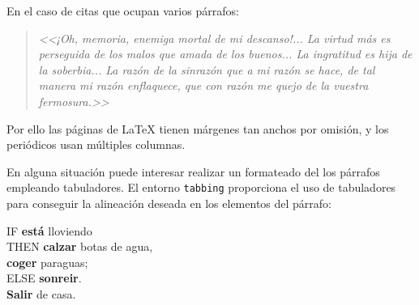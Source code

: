 \documentclass[11pt,a4paper]{report}
\begin{document}
En el caso de citas que ocupan varios párrafos:


\begin{quotation}
\emph{<<¡Oh, memoria, enemiga mortal de mi descanso!...
La virtud más es perseguida de los malos que amada de los buenos...
La ingratitud es hija de la soberbia...
La razón de la sinrazón que a mi razón se hace, de tal manera mi razón enflaquece, que con razón me quejo de la vuestra fermosura.>>}
\end{quotation}

Por ello las páginas de \LaTeX{} tienen márgenes tan anchos por omisión, y los periódicos usan múltiples columnas. 


En alguna situación puede interesar realizar un formateado del los párrafos empleando tabuladores. El entorno \texttt{tabbing} proporciona el uso de tabuladores para conseguir la alineación deseada en los elementos del párrafo:


\begin{tabbing}
IF	\= \textbf{está} lloviendo                \\
    \> THEN \= \textbf{calzar} botas de agua, \\
    \>      \> \textbf{coger} paraguas;       \\
    \> ELSE \> \textbf{sonreir}.              \\
\textbf{Salir} de casa.
\end{tabbing}
\end{document}
